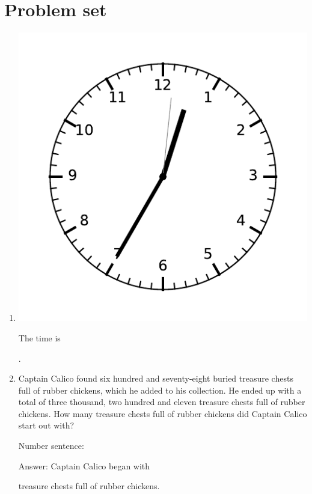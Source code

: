 \documentclass{tufte-book}
\begin{document}
\clearpage\section{Problem set }

\begin{enumerate}

\item \begin{marginfigure}\includegraphics[width=\textwidth]{fig/clock_1235.pdf}\end{marginfigure}
The time is \dotfill\bigskip\par\dotfill\bigskip.\par

\item Captain Calico found six hundred and seventy-eight buried treasure chests full of rubber chickens,
which he added to his collection. He ended up with a total of three thousand, two hundred and eleven treasure chests full of rubber chickens.
How many treasure chests full of rubber chickens did Captain Calico start out with?\bigskip\par
Number sentence: \dotfill\bigskip\par
Answer: Captain Calico began with 
\dotfill\bigskip\par\mbox{}\dotfill\bigskip\par\mbox{}\dotfill\bigskip\par\mbox{}\dotfill\bigskip
 treasure chests full of rubber chickens.


\end{enumerate}
\end{document}
